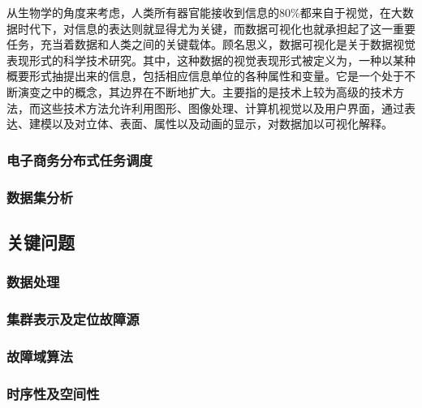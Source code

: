 从生物学的角度来考虑，人类所有器官能接收到信息的80\%都来自于视觉，在大数据时代下，对信息的表达则就显得尤为关键，而数据可视化也就承担起了这一重要任务，充当着数据和人类之间的关键载体。顾名思义，数据可视化是关于数据视觉表现形式的科学技术研究。其中，这种数据的视觉表现形式被定义为，一种以某种概要形式抽提出来的信息，包括相应信息单位的各种属性和变量。它是一个处于不断演变之中的概念，其边界在不断地扩大。主要指的是技术上较为高级的技术方法，而这些技术方法允许利用图形、图像处理、计算机视觉以及用户界面，通过表达、建模以及对立体、表面、属性以及动画的显示，对数据加以可视化解释。
\subsubsection{电子商务分布式任务调度}
\subsubsection{数据集分析}
\subsection{关键问题}
\subsubsection{数据处理}
\subsubsection{集群表示及定位故障源}
\subsubsection{故障域算法}
\subsubsection{时序性及空间性}